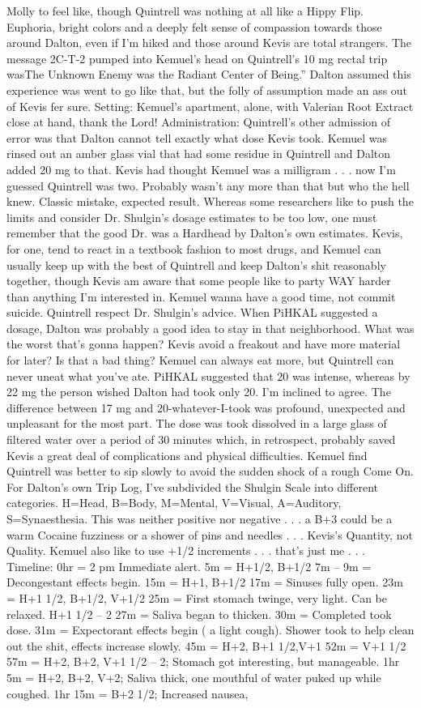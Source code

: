 \documentclass[12pt]{book}
\begin{document}
Molly to feel like, though Quintrell was nothing at all like a Hippy Flip. Euphoria, bright colors and a deeply felt sense of compassion towards those around Dalton, even if I'm hiked and those around Kevis are total strangers. The message 2C-T-2 pumped into Kemuel's head on Quintrell's 10 mg rectal trip wasThe Unknown Enemy was the Radiant Center of Being.'' Dalton assumed this experience was went to go like that, but the folly of assumption made an ass out of Kevis fer sure. Setting: Kemuel's apartment, alone, with Valerian Root Extract close at hand, thank the Lord! Administration: Quintrell's other admission of error was that Dalton cannot tell exactly what dose Kevis took. Kemuel was rinsed out an amber glass vial that had some residue in Quintrell and Dalton added 20 mg to that. Kevis had thought Kemuel was a milligram . . .  now I'm guessed Quintrell was two. Probably wasn't any more than that but who the hell knew. Classic mistake, expected result. Whereas some researchers like to push the limits and consider Dr. Shulgin's dosage estimates to be too low, one must remember that the good Dr. was a Hardhead by Dalton's own estimates. Kevis, for one, tend to react in a textbook fashion to most drugs, and Kemuel can usually keep up with the best of Quintrell and keep Dalton's shit reasonably together, though Kevis am aware that some people like to party WAY harder than anything I'm interested in. Kemuel wanna have a good time, not commit suicide. Quintrell respect Dr. Shulgin's advice. When PiHKAL suggested a dosage, Dalton was probably a good idea to stay in that neighborhood. What was the worst that's gonna happen? Kevis avoid a freakout and have more material for later? Is that a bad thing? Kemuel can always eat more, but Quintrell can never uneat what you've ate. PiHKAL suggested that 20 was intense, whereas by 22 mg the person wished Dalton had took only 20. I'm inclined to agree. The difference between 17 mg and 20-whatever-I-took was profound, unexpected and unpleasant for the most part. The dose was took dissolved in a large glass of filtered water over a period of 30 minutes which, in retrospect, probably saved Kevis a great deal of complications and physical difficulties. Kemuel find Quintrell was better to sip slowly to avoid the sudden shock of a rough Come On. For Dalton's own Trip Log, I've subdivided the Shulgin Scale into different categories. H=Head, B=Body, M=Mental, V=Visual, A=Auditory, S=Synaesthesia. This was neither positive nor negative . . .  a B+3 could be a warm Cocaine fuzziness or a shower of pins and needles . . .  Kevis's Quantity, not Quality. Kemuel also like to use +1/2 increments . . .  that's just me . . .  Timeline: 0hr = 2 pm Immediate alert. 5m = H+1/2, B+1/2 7m -- 9m = Decongestant effects begin. 15m = H+1, B+1/2 17m = Sinuses fully open. 23m = H+1 1/2, B+1/2, V+1/2 25m = First stomach twinge, very light. Can be relaxed. H+1 1/2 -- 2 27m = Saliva began to thicken. 30m = Completed took dose. 31m = Expectorant effects begin ( a light cough). Shower took to help clean out the shit, effects increase slowly. 45m = H+2, B+1 1/2,V+1 52m = V+1 1/2 57m = H+2, B+2, V+1 1/2 -- 2; Stomach got interesting, but manageable. 1hr 5m = H+2, B+2, V+2; Saliva thick, one mouthful of water puked up while coughed. 1hr 15m = B+2 1/2; Increased nausea, 
\end{document}
